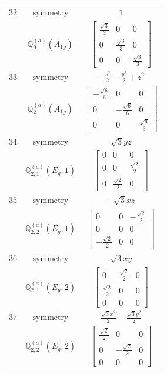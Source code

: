 \documentclass[fleqn,8pt,landscape]{jsarticle}
\begin{document}
\begin{longtable}{ccc}
$ 32 $ & $ \text{symmetry} $ & $ 1 $ \\
$  $ & $ \mathbb{Q}_{0}^{(a)}(A_{1g}) $ & $ \begin{bmatrix} \frac{\sqrt{3}}{3} & 0 & 0 \\ 0 & \frac{\sqrt{3}}{3} & 0 \\ 0 & 0 & \frac{\sqrt{3}}{3} \end{bmatrix} $ \\ \hline
$ 33 $ & $ \text{symmetry} $ & $ - \frac{x^{2}}{2} - \frac{y^{2}}{2} + z^{2} $ \\
$  $ & $ \mathbb{Q}_{2}^{(a)}(A_{1g}) $ & $ \begin{bmatrix} - \frac{\sqrt{6}}{6} & 0 & 0 \\ 0 & - \frac{\sqrt{6}}{6} & 0 \\ 0 & 0 & \frac{\sqrt{6}}{3} \end{bmatrix} $ \\ \hline
$ 34 $ & $ \text{symmetry} $ & $ \sqrt{3} y z $ \\
$  $ & $ \mathbb{Q}_{2,1}^{(a)}(E_{g},1) $ & $ \begin{bmatrix} 0 & 0 & 0 \\ 0 & 0 & \frac{\sqrt{2}}{2} \\ 0 & \frac{\sqrt{2}}{2} & 0 \end{bmatrix} $ \\ \hline
$ 35 $ & $ \text{symmetry} $ & $ - \sqrt{3} x z $ \\
$  $ & $ \mathbb{Q}_{2,2}^{(a)}(E_{g},1) $ & $ \begin{bmatrix} 0 & 0 & - \frac{\sqrt{2}}{2} \\ 0 & 0 & 0 \\ - \frac{\sqrt{2}}{2} & 0 & 0 \end{bmatrix} $ \\ \hline
$ 36 $ & $ \text{symmetry} $ & $ \sqrt{3} x y $ \\
$  $ & $ \mathbb{Q}_{2,1}^{(a)}(E_{g},2) $ & $ \begin{bmatrix} 0 & \frac{\sqrt{2}}{2} & 0 \\ \frac{\sqrt{2}}{2} & 0 & 0 \\ 0 & 0 & 0 \end{bmatrix} $ \\ \hline
$ 37 $ & $ \text{symmetry} $ & $ \frac{\sqrt{3} x^{2}}{2} - \frac{\sqrt{3} y^{2}}{2} $ \\
$  $ & $ \mathbb{Q}_{2,2}^{(a)}(E_{g},2) $ & $ \begin{bmatrix} \frac{\sqrt{2}}{2} & 0 & 0 \\ 0 & - \frac{\sqrt{2}}{2} & 0 \\ 0 & 0 & 0 \end{bmatrix} $ \\ \hline

\end{longtable}
\end{document}
